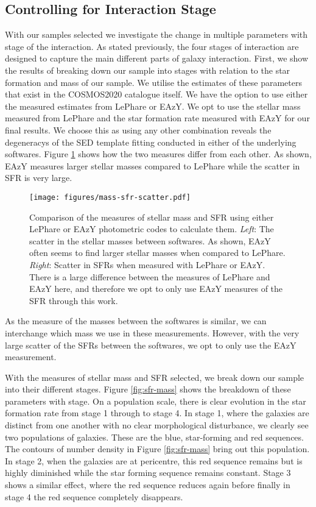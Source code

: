 \documentclass[fleqn,usenatbib]{mnras}
\begin{document}
\subsection{Controlling for Interaction Stage}
\noindent With our samples selected we investigate the change in multiple parameters with stage of the interaction. As stated previously, the four stages of interaction are designed to capture the main different parts of galaxy interaction. First, we show the results of breaking down our sample into stages with relation to the star formation and mass of our sample. We utilise the estimates of these parameters that exist in the COSMOS2020 catalogue itself. We have the option to use either the measured estimates from LePhare or EAzY. We opt to use the stellar mass measured from LePhare and the star formation rate measured with EAzY for our final results. We choose this as using any other combination reveals the degeneracys of the SED template fitting conducted in either of the underlying softwares. Figure \ref{fig:difference-measures} shows how the two measures differ from each other. As shown, EAzY measures larger stellar masses compared to LePhare while the scatter in SFR is very large.

\begin{figure}
    \centering
    \texttt{[image: figures/mass-sfr-scatter.pdf]}
    \caption{Comparison of the measures of stellar mass and SFR using either LePhare or EAzY photometric codes to calculate them. \textit{Left}: The scatter in the stellar masses between softwares. As shown, EAzY often seems to find larger stellar masses when compared to LePhare. \textit{Right}: Scatter in SFRs when measured with LePhare or EAzY. There is a large difference between the measures of LePhare and EAzY here, and therefore we opt to only use EAzY measures of the SFR through this work.}
    \label{fig:difference-measures}
\end{figure}

As the measure of the masses between the softwares is similar, we can interchange which mass we use in these measurements. However, with the very large scatter of the SFRs between the softwares, we opt to only use the EAzY measurement. %

With the measures of stellar mass and SFR selected, we break down our sample into their different stages. Figure \ref{fig:sfr-mass} shows the breakdown of these parameters with stage. On a population scale, there is clear evolution in the star formation rate from stage 1 through to stage 4. In stage 1, where the galaxies are distinct from one another with no clear morphological disturbance, we clearly see two populations of galaxies. These are the blue, star-forming and red sequences. The contours of number density in Figure \ref{fig:sfr-mass} bring out this population. In stage 2, when the galaxies are at pericentre, this red sequence remains but is highly diminished while the star forming sequence remains constant. Stage 3 shows a similar effect, where the red sequence reduces again before finally in stage 4 the red sequence completely disappears.
\end{document}
